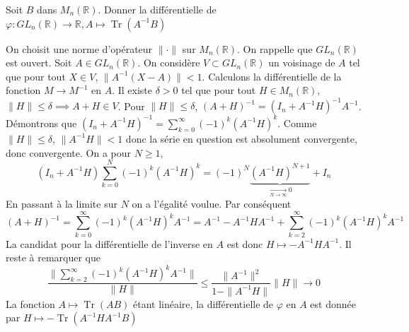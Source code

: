 \documentclass{fancybook}
\DeclareMathOperator{\Tr}{Tr}
\begin{document}
\begin{exercice}
Soit $B$ dans $M_n(\mathbb R)$.\newline
Donner la différentielle de $\varphi: GL_n(\mathbb R) \to \mathbb R, A\mapsto \Tr(A^{-1}B)$
\end{exercice}
On choisit une norme d'opérateur $\| \cdot \|$ sur $M_n(\mathbb R)$. On rappelle que $GL_n(\mathbb R)$ est ouvert.\newline
Soit $A\in GL_n(\mathbb R)$. On considère $V\subset GL_n(\mathbb R)$ un voisinage de $A$ tel que pour tout $X\in V$, $\|A^{-1}(X-A)\| <1$. Calculons la différentielle de la fonction $M\to M^{-1}$ en $A$.\newline
Il existe $\delta>0$ tel que pour tout $H\in M_n(\mathbb R)$, $\|H\| \leq \delta \implies A+H\in V$.\newline
Pour $\|H\|\leq \delta$, $(A+H)^{-1}=(I_n+A^{-1}H)^{-1}A^{-1}$.\newline
Démontrons que $(I_n+A^{-1}H)^{-1} = \sum_{k=0}^\infty (-1)^k (A^{-1}H)^k$. Comme $\|H\|\leq \delta$, $\|A^{-1}H\| <1$ donc la série en question est absolument convergente, donc convergente. On a pour $N\geq 1$, $$(I_n+A^{-1}H)\sum_{k=0}^N (-1)^k (A^{-1}H)^k = (-1)^N\underbrace{(A^{-1}H)^{N+1}}_{\xrightarrow[N\to \infty]{}0} + I_n$$
En passant à la limite sur $N$ on a l'égalité voulue. \newline
Par conséquent $$(A+H)^{-1}= \sum_{k=0}^\infty (-1)^k (A^{-1}H)^kA^{-1}=A^{-1} - A^{-1}HA^{-1}+\sum_{k=2}^\infty (-1)^k (A^{-1}H)^kA^{-1}$$
La candidat pour la différentielle de l'inverse en $A$ est donc $H\mapsto - A^{-1}HA^{-1}$.\newline
Il reste à remarquer que $$ \dfrac{\| \sum_{k=2}^\infty (-1)^k (A^{-1}H)^kA^{-1} \|}{\| H\|}\leq \dfrac{\|A^{-1}\|^2}{1-\|A^{-1}H\|}\|H\|\to 0$$
La fonction $A\mapsto \Tr(AB)$ étant linéaire, la différentielle de $\varphi$ en $A$ est donnée par $H\mapsto -\Tr(A^{-1}HA^{-1}B)$
\end{document}
